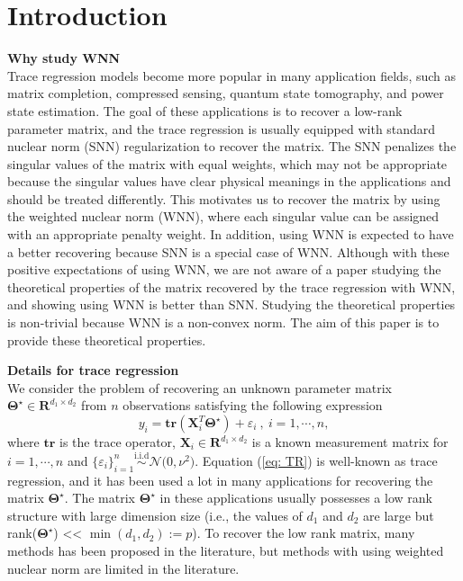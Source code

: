 \documentclass[12pt]{article}
\begin{document}
\section{Introduction}
{\bf Why study WNN}\\
Trace regression models become more popular in many application fields, such as matrix completion, compressed sensing, quantum state tomography, and power state estimation. The goal of these applications is to recover a low-rank parameter matrix, and the trace regression is usually equipped with standard nuclear norm (SNN) regularization to recover the matrix. The SNN penalizes the singular values of the matrix with equal weights, which may not be appropriate because the singular values have clear physical meanings in the applications and should be treated differently. This motivates us to recover the matrix by using the weighted nuclear norm (WNN), where each singular value can be assigned with an appropriate penalty weight. In addition, using WNN is expected to have a better recovering because SNN is a special case of WNN. Although with these positive expectations of using WNN,  we are not aware of a paper studying the theoretical properties of the matrix recovered by the trace regression with WNN, and showing using WNN is better than SNN. Studying the theoretical properties is non-trivial because WNN is a non-convex norm. The aim of this paper is to provide these theoretical properties.

{\bf Details for trace regression}\\
We consider the problem of recovering an unknown parameter matrix $\boldsymbol{\Theta^\star}\in \mathbf{R}^{d_{1} \times d_{2}}$ from $n$ observations satisfying the following expression
\begin{equation}
    y_{i} = \textbf{tr}(\mathbf{X}^{T}_{i}\boldsymbol{\Theta^\star}) + \varepsilon_{i} \ ,\ i = 1, \cdots, n, \label{eq: TR}
\end{equation}
where $\textbf{tr}$ is the trace operator, $\mathbf{X}_{i} \in \mathbf{R}^{d_{1} \times d_{2}}$ is a known measurement matrix for $i = 1, \cdots, n$ and $\big\{\varepsilon_{i}\big\}_{i=1}^{n}\stackrel{\text{i.i.d}}{\sim} \mathcal{N}\big( 0, \nu^{2} \big)$. 
Equation (\ref{eq: TR}) is well-known as trace regression, and it has been used a lot in many applications for recovering the matrix $\boldsymbol{\Theta^\star}$. 
The matrix $\boldsymbol{\Theta^\star}$ in these applications usually possesses a low rank structure with large dimension size (i.e., the values of $d_{1}$ and $d_{2}$ are large but rank($\boldsymbol{\Theta^\star}$) << $\min(d_{1}, d_{2}):=p$). 
To recover the low rank matrix, many methods has been proposed in the literature, but methods with using weighted nuclear norm are limited in the literature.
\end{document}
